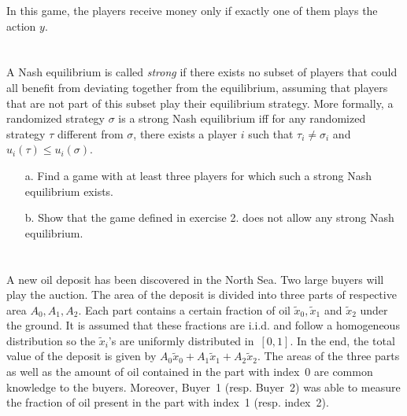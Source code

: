 \documentclass{../ape}
\begin{document}
In this game, the players receive money only if exactly one of them plays the action $y$.

\begin{solution}

\end{solution}

\section{}
A Nash equilibrium is called \emph{strong} if there exists no subset of players that could all benefit from deviating together from the equilibrium, assuming that players that are not part of this subset play their equilibrium strategy. More formally, a randomized strategy $\sigma$ is a strong Nash equilibrium iff for any randomized strategy $\tau$ different from $\sigma$, there exists a player $i$ such that $\tau_i \neq \sigma_i$ and $u_i(\tau) \leq u_i(\sigma)$.
\begin{enumerate}
	\item[a.] Find a game with at least three players for which such a strong Nash equilibrium exists.
	\item[b.] Show that the game defined in exercise 2. does not allow any strong Nash equilibrium.
\end{enumerate}

\section{}
A new oil deposit has been discovered in the North Sea. Two large buyers will play the auction. 
The area of the deposit is divided into three parts of respective area $A_0, A_1, A_2$. Each part contains a certain fraction of oil $\tilde{x}_0, \tilde{x}_1$ and $\tilde{x}_2$ under the ground. It is assumed that these fractions are i.i.d. and follow a homogeneous distribution so the $\tilde{x}_i$'s are uniformly distributed in~$[0, 1]$. In the end, the total value of the deposit is given by $A_0 \tilde{x}_0 + A_1 \tilde{x}_1 + A_2 \tilde{x}_2$. The areas of the three parts as well as the amount of oil contained in the part with index~0 are common knowledge to the buyers. Moreover, Buyer~1 (resp. Buyer~2) was able to measure the fraction of oil present in the part with index~1 (resp. index~2).
\end{document}
